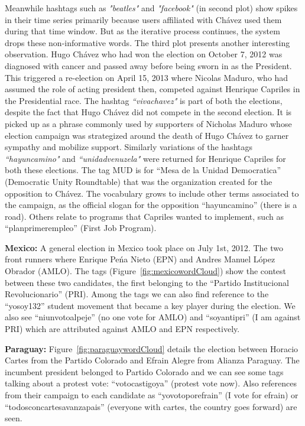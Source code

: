 Meanwhile hashtags such as \emph{"beatles"} and \emph{"facebook"} (in second plot) show spikes in their time series primarily because users affiliated with Ch\'{a}vez used them during that time window. 
But as the iterative process continues, the system drops these non-informative words.
The third plot presents another interesting observation.
Hugo Ch\'{a}vez who had won the election on October 7, 2012 was diagnosed with cancer and passed away
before being sworn in as the President.
This triggered a re-election on April 15, 2013 where Nicolas Maduro, who had assumed the role of acting president then, competed 
against Henrique Capriles in the Presidential race.
The hashtag \emph{``vivachavez"} is part of both the elections, despite the 
fact that Hugo Ch\'{a}vez did not compete in the second election.
It is picked up as a phrase commonly used by supporters of Nicholas Maduro whose election campaign was strategized around the death of Hugo Ch\'{a}vez to garner sympathy and mobilize support.
Similarly variations of the hashtags \emph{``hayuncamino"} and \emph{``unidadvenuzela"} were returned 
for Henrique Capriles for both these elections.
The tag MUD is for ``Mesa de la Unidad Democratica” (Democratic Unity Roundtable) that was the organization created for the opposition to Ch\'{a}vez. 
The vocabulary grows to include other terms associated to the campaign, as the official slogan for the opposition ``hayuncamino” (there is a road). 
Others relate to programs that Capriles wanted to implement, such as ``planprimerempleo” (First Job Program). 

\noindent	
{\bf Mexico:} A general election in Mexico took place on July 1st, 2012.
The two front runners where Enrique Pe\'{n}a Nieto (EPN) and Andres Manuel L\'{o}pez Obrador (AMLO).
The tags (Figure~\ref{fig:mexicowordCloud}) show the contest between these two candidates, the first belonging to the “Partido Institucional Revolucionario” (PRI). 
Among the tags we can also find reference to the “yosoy132” student movement that became a key player during the election. 
We also see “niunvotoalpeje” (no one vote for AMLO) and “soyantipri” (I am against PRI) which are attributed against AMLO and EPN respectively.

\noindent
{\bf Paraguay:}
Figure~\ref{fig:paraguaywordCloud} details the election between Horacio Cartes from the Partido Colorado and Efrain Alegre from Alianza Paraguay. 
The incumbent president belonged to Partido Colorado and we can see some tags talking about a protest vote: “votocastigoya” (protest vote now). 
Also references from their campaign to each candidate as “yovotoporefrain” (I vote for efrain) or “todosconcartesavanzapais” (everyone with cartes, the country goes forward) are seen.

